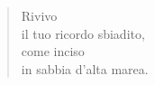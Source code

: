 
\begin{verse}
    Rivivo\\
    il tuo ricordo sbiadito,\\
    come inciso\\
    in sabbia d'alta marea.
\end{verse}